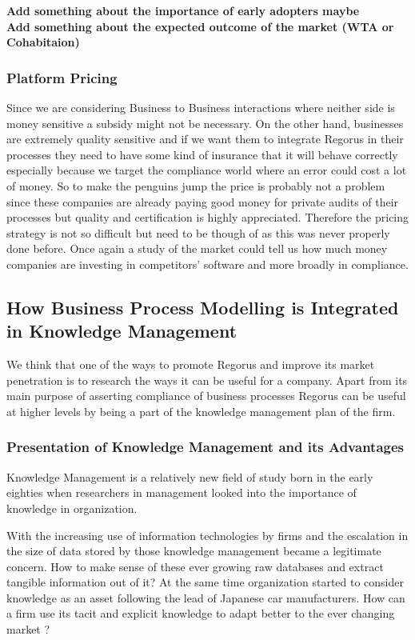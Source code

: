 \documentclass[10pt]{report}
\begin{document}
\textbf{Add something about the importance of early adopters maybe}\\
\textbf{Add something about the expected outcome of the market (WTA or Cohabitaion)}

\subsubsection{Platform Pricing} 
Since we are considering Business to Business interactions where neither side is money sensitive a subsidy might not be necessary. On the other hand, businesses are extremely quality sensitive and if we want them to integrate Regorus in their processes they need to have some kind of insurance that it will behave correctly especially because we target the compliance world where an error could cost a lot of money. So to make the penguins jump the price is probably not a problem since these companies are already paying good money for private audits of their processes but quality and certification is highly appreciated. Therefore the pricing strategy is not so difficult but need to be though of as this was never properly done before. Once again a study of the market could tell us how much money companies are investing in competitors' software and more broadly in compliance.




\subsection{How Business Process Modelling is Integrated in Knowledge Management}

We think that one of the ways to promote Regorus and improve its market penetration is to research the ways it can be useful for a company. Apart from its main purpose of asserting compliance of business processes Regorus can be useful at higher levels by being a part of the knowledge management plan of the firm.

\subsubsection{Presentation of Knowledge Management and its Advantages}

Knowledge Management is a relatively new field of study born in the early eighties when researchers in management looked into the importance of knowledge in organization.\autocite{Wiig19971}

With the increasing use of information technologies by firms and the escalation in the size of data stored by those knowledge management became a legitimate concern. How to make sense of these ever growing raw databases and extract tangible information out of it? At the same time organization started to consider knowledge as an asset following the lead of Japanese car manufacturers.\autocite{Koenig08} How can a firm use its tacit and explicit knowledge to adapt better to the ever changing market ?
\end{document}
